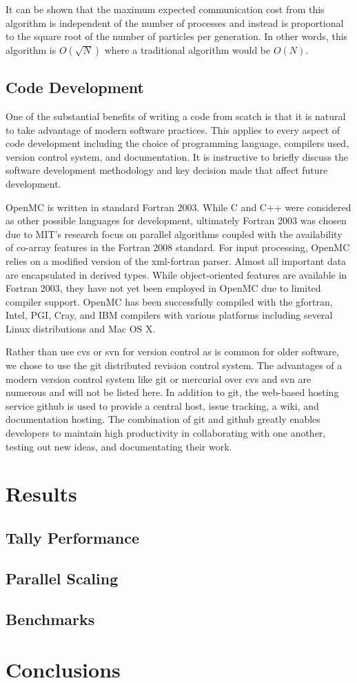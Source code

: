 \documentclass{elsarticle}
\begin{document}
It can be shown that the maximum expected communication cost from this algorithm
is independent of the number of processes and instead is proportional to the
square root of the number of particles per generation. In other words, this
algorithm is $O({\sqrt{N}})$ where a traditional algorithm would be $O({N})$.

\subsection{Code Development}

One of the substantial benefits of writing a code from scatch is that it is
natural to take advantage of modern software practices. This applies to every
aspect of code development including the choice of programming language,
compilers used, version control system, and documentation. It is instructive to briefly
discuss the software development methodology and key decision made that affect
future development.

OpenMC is written in standard Fortran 2003. While C and C++ were considered as
other possible languages for development, ultimately Fortran 2003 was chosen due
to MIT's research focus on parallel algorithms coupled with the availability of
co-array features in the Fortran 2008 standard. For input processing, OpenMC
relies on a modified version of the xml-fortran \cite{xml-fortran}
parser. Almost all important data are encapsulated in derived types. While
object-oriented features are available in Fortran 2003, they have not yet been
employed in OpenMC due to limited compiler support. OpenMC has been successfully
compiled with the gfortran, Intel, PGI, Cray, and IBM compilers with various
platforms including several Linux distributions and Mac OS X.

Rather than use cvs or svn for version control as is common for older software,
we chose to use the git distributed revision control system. The advantages of a
modern version control system like git or mercurial over cvs and svn are
numerous and will not be listed here. In addition to git, the web-based hosting
service github is used to provide a central host, issue tracking, a wiki, and
documentation hosting. The combination of git and github greatly enables
developers to maintain high productivity in collaborating with one another,
testing out new ideas, and documentating their work.

\section{Results}

\subsection{Tally Performance}

\subsection{Parallel Scaling}

\subsection{Benchmarks}

\section{Conclusions}



\end{document}
